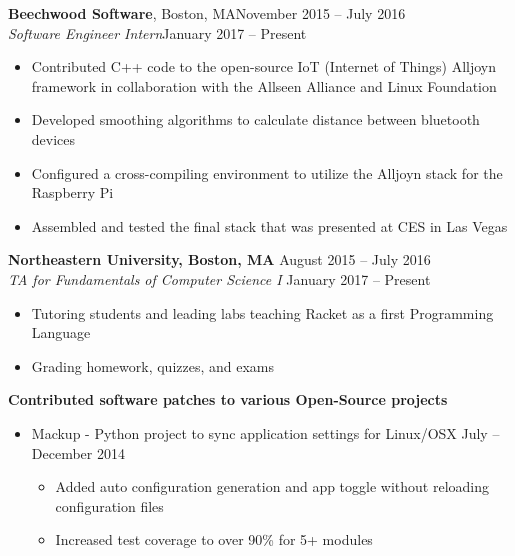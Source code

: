 \documentclass[overlapped,line]{res}
\begin{document}
\begin{resume}
\textbf{Beechwood Software}, Boston, MA\hfill November 2015 \--- July 2016  \\
                 {\sl Software Engineer Intern}\hfill January 2017 \--- Present
                 \begin{itemize}  \itemsep -2pt
                 \item Contributed C++ code to the open-source IoT (Internet of Things) Alljoyn framework in collaboration with the Allseen Alliance and Linux Foundation 
                 \item Developed smoothing algorithms to calculate distance between bluetooth devices 
                 \item Configured a cross-compiling environment to utilize the Alljoyn stack for the Raspberry Pi 
                 \item Assembled and tested the final stack that was presented at CES in Las Vegas
                \end{itemize}
              	\textbf{Northeastern University, Boston, MA } \hfill August 2015 \--- July 2016 \\ 
              	{\sl TA for Fundamentals of Computer Science I} \hfill January 2017 \--- Present
              	\begin{itemize} \itemsep -2pt
              	\item Tutoring students and leading labs teaching Racket as a first Programming Language
              	\item Grading homework, quizzes, and exams
              	\end{itemize}
                \textbf{Contributed software patches to various Open-Source projects}
                  \begin{itemize}  \itemsep -7pt
                  \item Mackup - Python project to sync application settings for Linux/OSX \hfill July \--- December 2014
                   		\begin{itemize} \itemsep 5pt \parskip -7pt
                   		\item Added auto configuration generation and app toggle without reloading configuration files
                   		\item Increased test coverage to over 90\% for 5+ modules
                   		\end{itemize} 
                  \end{itemize}
\noindent\makebox[6.5in]{\rule{6.5in}{0.4pt}}

\end{resume}
\end{document}
